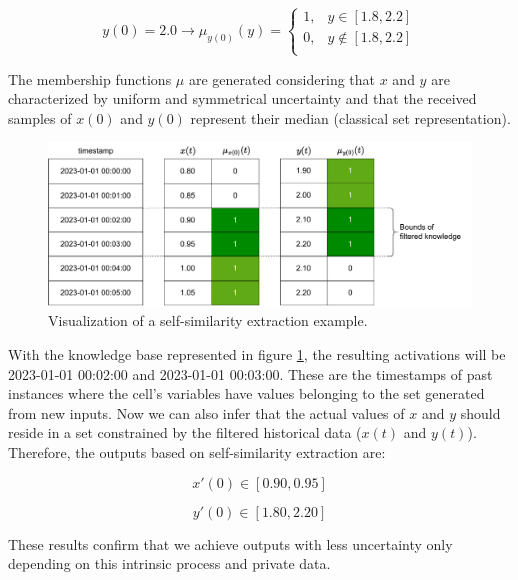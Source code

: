 \begin{equation}
    y(0) = 2.0 \rightarrow \mu_{y(0)}(y) =
    \begin{cases}
        1, & y \in [1.8, 2.2]    \\
        0, & y \notin [1.8, 2.2] \\
    \end{cases}
\end{equation}

The membership functions $\mu$ are generated considering that $x$ and $y$ are characterized by uniform and symmetrical uncertainty and that the received samples of $x(0)$ and $y(0)$ represent their median (classical set representation).

\begin{figure}[h!]
    \centering
    \includegraphics[width=\linewidth]{figures/chapter4/cell/solo_state_estimation.pdf}
    \caption{Visualization of a self-similarity extraction example.}
    \label{fig:solo_state_estimation}
\end{figure}


With the knowledge base represented in figure \ref{fig:solo_state_estimation}, the resulting activations will be 2023-01-01 00:02:00 and 2023-01-01 00:03:00. These are the timestamps of past instances where the cell's variables have values belonging to the set generated from new inputs. Now we can also infer that the actual values of $x$ and $y$ should reside in a set constrained by the filtered historical data ($x(t)$ and $y(t)$). Therefore, the outputs based on self-similarity extraction are:

\begin{equation}
    x'(0) \in [0.90, 0.95]
\end{equation}

\begin{equation}
    y'(0) \in [1.80, 2.20]
\end{equation}

These results confirm that we achieve outputs with less uncertainty only depending on this intrinsic process and private data.

